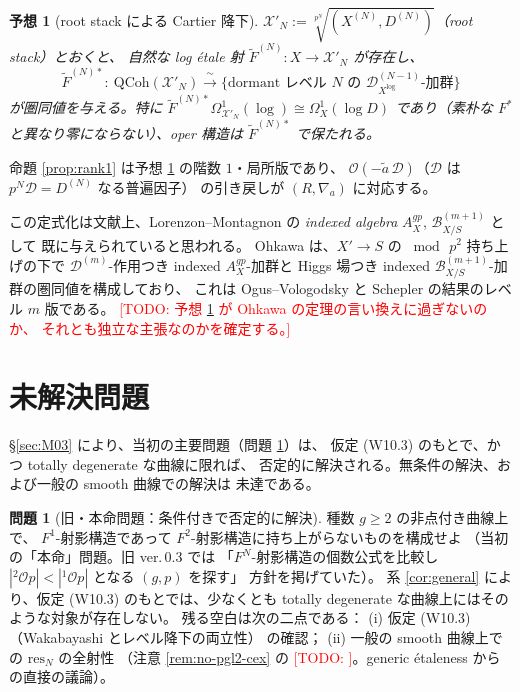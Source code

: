 \documentclass[a4paper,11pt]{ltjsarticle}
\theoremstyle{plain}
\newtheorem{conjecture}[theorem]{予想}
\theoremstyle{definition}
\newtheorem{question}[theorem]{問題}
\newcommand{\Todo}[1]{\textcolor{red}{\textsf{[TODO: #1]}}}
\newcommand{\cD}{\mathcal{D}}
\newcommand{\cO}{\mathcal{O}}
\newcommand{\Op}{\mathcal{O}p}
\newcommand{\Dlog}[1]{\cD^{(#1)}_{X^{\log}}}
\begin{document}
\begin{conjecture}[root stack による Cartier 降下]\label{conj:rootstack}
$\mathcal{X}'_N:=\sqrt[p^N]{(X^{(N)},D^{(N)})}$（root stack）とおくと、
自然な log étale 射 $\widetilde F^{(N)}:X\to\mathcal{X}'_N$ が存在し、
\[
  \widetilde F^{(N)*}:\ \mathrm{QCoh}(\mathcal{X}'_N)
  \xrightarrow{\ \sim\ }\bigl\{\text{dormant レベル }N\text{ の }\Dlog{N-1}\text{-加群}\bigr\}
\]
が圏同値を与える。特に
$\widetilde F^{(N)*}\Omega^1_{\mathcal{X}'_N}(\log)\cong\Omega^1_X(\log D)$
であり（素朴な $F^*$ と異なり零にならない）、oper 構造は $\widetilde F^{(N)*}$ で保たれる。
\end{conjecture}

命題 \ref{prop:rank1} は予想 \ref{conj:rootstack} の階数 $1$・局所版であり、
$\cO(-\tilde a\,\mathcal{D})$（$\mathcal{D}$ は $p^N\mathcal{D}=D^{(N)}$ なる普遍因子）
の引き戻しが $(R,\nabla_a)$ に対応する。

この定式化は文献上、Lorenzon--Montagnon の
\emph{indexed algebra} $A^{gp}_X$, $\mathcal{B}^{(m+1)}_{X/S}$ として
既に与えられていると思われる。
Ohkawa \cite{Ohk} は、$X'\to S$ の $\bmod\,p^2$ 持ち上げの下で
$\cD^{(m)}$-作用つき indexed $A^{gp}_X$-加群と
Higgs 場つき indexed $\mathcal{B}^{(m+1)}_{X/S}$-加群の圏同値を構成しており、
これは Ogus--Vologodsky \cite{OV} と Schepler \cite{Sch} の結果のレベル $m$ 版である。
\Todo{予想 \ref{conj:rootstack} が Ohkawa の定理の言い換えに過ぎないのか、
それとも独立な主張なのかを確定する。}

\section{未解決問題}\label{sec:open}

\S\ref{sec:M03} により、当初の主要問題（問題 \ref{q:main}）は、
仮定 (W10.3) のもとで、かつ totally degenerate な曲線に限れば、
否定的に解決される。無条件の解決、および一般の smooth 曲線での解決は
未達である。

\begin{question}[旧・本命問題：条件付きで否定的に解決]\label{q:main}
種数 $g\ge2$ の非点付き曲線上で、
$F^1$-射影構造であって $F^2$-射影構造に持ち上がらないものを構成せよ
（当初の「本命」問題。旧 ver.\,0.3 では
「$F^N$-射影構造の個数公式を比較し $|{}^2\Op|<|{}^1\Op|$ となる $(g,p)$ を探す」
方針を掲げていた）。
系 \ref{cor:general} により、仮定 (W10.3) のもとでは、少なくとも
totally degenerate な曲線上にはそのような対象が存在しない。
残る空白は次の二点である：
(i) 仮定 (W10.3)（Wakabayashi \cite[Prop.~10.3.3]{Wak2} とレベル降下の両立性）
の確認；
(ii) 一般の smooth 曲線上での $\mathrm{res}_N$ の全射性
（注意 \ref{rem:no-pgl2-cex} の \Todo{}。generic étaleness \cite[Thm.~C]{Wak2}
からの直接の議論）。
\end{question}
\end{document}
